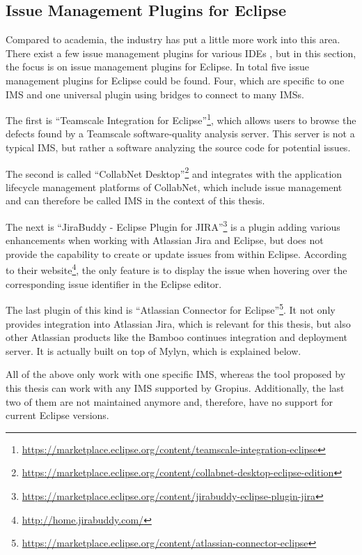 \subsection{Issue Management Plugins for Eclipse}
\label{ssec:ch2:ss2.3}
Compared to academia, the industry has put a little more work into this area.
There exist a few issue management plugins for various \glspl{IDE} \cite{janak2009issue}, 
but in this section, the focus is on issue management plugins for \gls{Eclipse}.
In total five issue management plugins for \gls{Eclipse} could be found.
Four, which are specific to one \gls{IMS} and one universal plugin using bridges to connect to many \glspl{IMS}.

The first is ``Teamscale Integration for Eclipse''\footnote{\url{https://marketplace.eclipse.org/content/teamscale-integration-eclipse}}, 
which allows users to browse the defects found by a Teamscale software‐quality analysis server.
This server is not a typical \gls{IMS}, but rather a software analyzing the source code for potential issues.

The second is called ``CollabNet Desktop''\footnote{\url{https://marketplace.eclipse.org/content/collabnet-desktop-eclipse-edition}} and 
integrates with the application lifecycle management platforms of CollabNet, which include issue management and can therefore be called \gls{IMS} in the context of this thesis.

The next is ``JiraBuddy - Eclipse Plugin for JIRA''\footnote{\url{https://marketplace.eclipse.org/content/jirabuddy-eclipse-plugin-jira}}
is a plugin adding various enhancements when working with Atlassian Jira and \gls{Eclipse}, but does not provide the capability to create or update 
issues from within \gls{Eclipse}. According to their website\footnote{\url{http://home.jirabuddy.com/}}, the only feature is to display the issue when hovering over the corresponding issue identifier in the \gls{Eclipse} editor.

The last plugin of this kind is ``Atlassian Connector for Eclipse''\footnote{\url{https://marketplace.eclipse.org/content/atlassian-connector-eclipse}}.
It not only provides integration into Atlassian Jira, which is relevant for this thesis, but also other Atlassian products like the Bamboo continues integration and deployment server.
It is actually built on top of Mylyn, which is explained below.

All of the above only work with one specific \gls{IMS}, whereas the tool proposed by this thesis can work with any \gls{IMS} supported by \gls{Gropius}.
Additionally, the last two of them are not maintained anymore and, therefore, have no support for current \gls{Eclipse} versions. 

